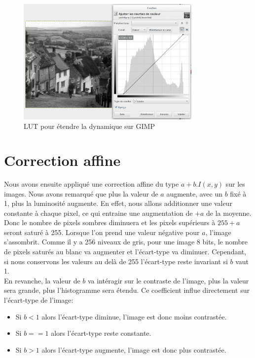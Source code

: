 \documentclass[a4paper,11pt]{article}
\begin{document}
    \begin{figure}[H]
    \center
    \includegraphics[width=9cm]{LUT-Q1.png}
    \caption{LUT pour étendre la dynamique sur GIMP}
  \end{figure}
  
  \section{Correction affine}
  Nous avons ensuite appliqué une correction affine du type $a+b.I(x,y)$ sur les images.
  Nous avons remarqué que plus la valeur de $a$ augmente, avec un $b$ fixé à 1, plus la 
  luminosité augmente. En effet, nous allons additionner une valeur constante à chaque 
  pixel, ce qui entraine une augmentation de $+a$ de la moyenne. Donc le nombre de pixels 
  sombres diminuera et les pixels supérieurs à $255+a$ seront saturé à 255.
  Lorsque l'on prend une valeur négative pour $a$, l'image s'assombrit. Comme il y a 256 
  niveaux de gris, pour une image 8 bits, le nombre de pixels saturés au blanc va augmenter
  et l'écart-type va diminuer. Cependant, si nous conservons les valeurs au delà de 255 
  l'écart-type reste invariant si $b$ vaut 1.\\
  
  En revanche, la valeur de $b$ va intéragir sur le contraste de l'image, plus la valeur 
  sera grande, plus l'histogramme sera étendu. Ce coefficient influe directement sur 
  l'écart-type de l'image:
  \begin{itemize}
   \item Si $b<1$ alors l'écart-type diminue, l'image est donc moins contrastée.
   \item Si $b==1$ alors l'écart-type reste constante.
   \item Si $b>1$ alors l'écart-type augmente, l'image est donc plus contrastée.
  \end{itemize}
  \ \\
  
\end{document}
